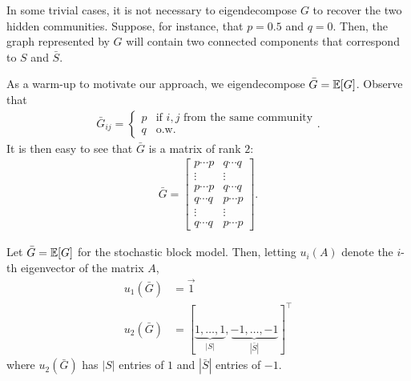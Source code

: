 In some trivial cases, it is not necessary to eigendecompose $G$ to recover the two hidden communities. Suppose, for instance, that $p = 0.5$ and $q = 0$. Then, the graph represented by $G$ will contain two connected components that correspond to $S$ and $\bar{S}$.

As a warm-up to motivate our approach, we eigendecompose $\bar{G} = \operatorname*{\mathbb{E}}[G]$. Observe that
\begin{align}
    \bar{G}_{ij} = \begin{cases}
        p &\text{if $i,j$ from the same community} \\
        q &\text{o.w.} \end{cases}.
\end{align}
It is then easy to see that $\bar{G}$ is a matrix of rank $2$:
\begin{align}
    \bar{G} = \left[
        \begin{array}{c|c}
        p \cdots p & q \cdots q \\
        \vdots & \vdots \\
        p \cdots p & q \cdots q\\
        \hline
        q \cdots q & p \cdots p \\
        \vdots & \vdots \\
        q \cdots q & p \cdots p 
        \end{array}
        \right].
\end{align}
\begin{lemma} \label{lec19:lma:sbm_eigen}
Let $\bar{G} = \operatorname*{\mathbb{E}}[G]$ for the stochastic block model. Then, letting $u_i(A)$ denote the $i$-th eigenvector of the matrix $A$,
\begin{align}
    u_1(\bar{G}) &= \vec{1} \label{lec19:eqn:top_eig_G}\\
    u_2(\bar{G}) &= [\underbrace{1, \dots, 1}_{|S|}, \underbrace{-1, \dots, -1}_{|\bar{S}|}]^\top \label{lec19:eqn:second_eig_G}
\end{align}
where $u_2(\bar{G})$ has $|S|$ entries of $1$ and $|\bar{S}|$ entries of $-1$.
\end{lemma}

